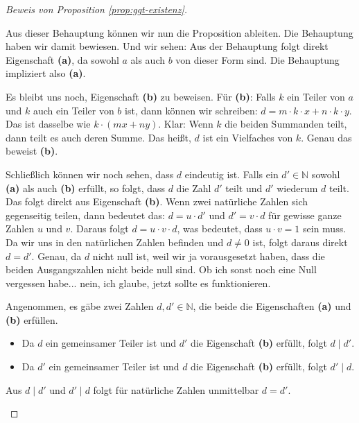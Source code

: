 \begin{proof}[Beweis von Proposition \ref{prop:ggt-existenz}]
\begin{spoken-clean}[00:22:45 - 00:24:50]
Aus dieser Behauptung können wir nun die Proposition ableiten. Die Behauptung haben wir damit bewiesen. Und wir sehen: Aus der Behauptung folgt direkt Eigenschaft \textbf{(a)}, da sowohl $a$ als auch $b$ von dieser Form sind. Die Behauptung impliziert also \textbf{(a)}.

Es bleibt uns noch, Eigenschaft \textbf{(b)} zu beweisen. Für \textbf{(b)}: Falls $k$ ein Teiler von $a$ und $k$ auch ein Teiler von $b$ ist, dann können wir schreiben: $d = m \cdot k \cdot x + n \cdot k \cdot y$. Das ist dasselbe wie $k \cdot (mx + ny)$. Klar: Wenn $k$ die beiden Summanden teilt, dann teilt es auch deren Summe. Das heißt, $d$ ist ein Vielfaches von $k$. Genau das beweist \textbf{(b)}.

Schließlich können wir noch sehen, dass $d$ eindeutig ist. Falls ein $d' \in \mathbb{N}$ sowohl \textbf{(a)} als auch \textbf{(b)} erfüllt, so folgt, dass $d$ die Zahl $d'$ teilt und $d'$ wiederum $d$ teilt. Das folgt direkt aus Eigenschaft \textbf{(b)}. Wenn zwei natürliche Zahlen sich gegenseitig teilen, dann bedeutet das: $d = u \cdot d'$ und $d' = v \cdot d$ für gewisse ganze Zahlen $u$ und $v$. Daraus folgt $d = u \cdot v \cdot d$, was bedeutet, dass $u \cdot v = 1$ sein muss. Da wir uns in den natürlichen Zahlen befinden und $d \neq 0$ ist, folgt daraus direkt $d = d'$. Genau, da $d$ nicht null ist, weil wir ja vorausgesetzt haben, dass die beiden Ausgangszahlen nicht beide null sind.  Ob ich sonst noch eine Null vergessen habe... nein, ich glaube, jetzt sollte es funktionieren.
\end{spoken-clean}

\begin{math-stroke}
\begin{short-proof}
Angenommen, es gäbe zwei Zahlen $d, d' \in \mathbb{N}$, die beide die Eigenschaften \textbf{(a)} und \textbf{(b)} erfüllen.
\begin{itemize}
    \item Da $d$ ein gemeinsamer Teiler ist und $d'$ die Eigenschaft \textbf{(b)} erfüllt, folgt $d \mid d'$.
    \item Da $d'$ ein gemeinsamer Teiler ist und $d$ die Eigenschaft \textbf{(b)} erfüllt, folgt $d' \mid d$.
\end{itemize}
Aus $d \mid d'$ und $d' \mid d$ folgt für natürliche Zahlen unmittelbar $d = d'$.
\end{short-proof}
\end{math-stroke}
\end{proof}

